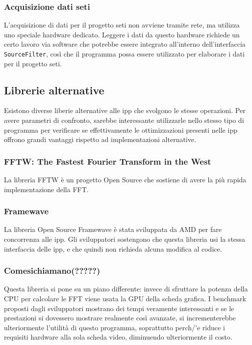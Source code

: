 \subsubsection{Acquisizione dati \ac{seti}}
\label{seti}
L'acquisizione di dati per il progetto \ac{seti} non avviene tramite rete, ma
utilizza uno speciale hardware dedicato. Leggere i dati da questo hardware
richiede un certo lavoro via software che potrebbe essere integrato all'interno
dell'interfaccia \texttt{SourceFilter}, cos\`i che il programma possa essere
utilizzato per elaborare i dati per il progetto \ac{seti}.

\subsection{Librerie alternative}
\label{altlib}

Esistono diverse liberie alternative alle \ac{ipp} che svolgono le stesse
operazioni. Per avere parametri di confronto, sarebbe interessante utilizzarle
nello stesso tipo di programma per verificare se effettivamente le
ottimizzazioni presenti nelle \ac{ipp} offrono grandi vantaggi rispetto ad
implementazioni alternative.

\subsubsection{FFTW: The Fastest Fourier Transform in the West}
La libreria FFTW \`e un progetto Open Source che sostiene di avere la pi\`u
rapida implementazione della \ac{FFT}.

\subsubsection{Framewave}
La libreria Open Source Framewave \`e stata sviluppata da AMD per fare
concorrenza alle \ac{ipp}. Gli sviluppatori sostengono che questa libreria usi
la stessa interfaccia delle \ac{ipp}, e che quindi non richieda alcuna modifica al
codice. 

\subsubsection{Comesichiamano(?????)}
Questa libreria si pone su un piano differente: invece di sfruttare la potenza
della CPU per calcolare le FFT viene usata la GPU della scheda grafica. I
benchmark proposti dagli sviluppatori mostrano dei tempi veramente interessanti
e se le prestazioni si dovessero mostrare realmente cos\`i avanzate, si
incrementerebbe ulteriormente l'utilit\`a di questo programma, soprattutto
perch/'e riduce i requisiti hardware alla sola scheda video, diminuendo
ulteriormente il costo.

